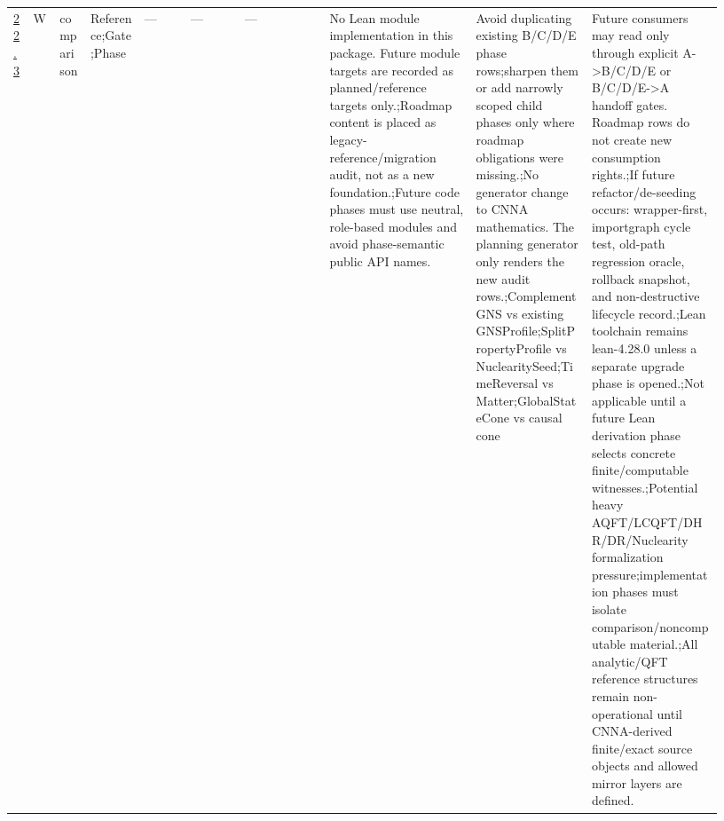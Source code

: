 \begin{longtable}{L{0.026\linewidth} L{0.024\linewidth} L{0.045\linewidth} L{0.07\linewidth} L{0.065\linewidth} L{0.075\linewidth} L{0.11\linewidth} L{0.19\linewidth} L{0.155\linewidth} L{0.17\linewidth}}
\hline
\addlinespace[0.24em]
\hyperlink{phase-row-22-3}{22.3} & W & comparison & Reference;\newline Gate;\newline Phase & --- & --- & --- & No Lean module implementation in this package. Future module targets are recorded as planned/\allowbreak{}reference targets only.;\newline Roadmap content is placed as legacy-reference/\allowbreak{}migration audit, not as a new foundation.;\newline Future code phases must use neutral, role-based modules and avoid phase-semantic public API names. & Avoid duplicating existing B/\allowbreak{}C/\allowbreak{}D/\allowbreak{}E phase rows;\newline sharpen them or add narrowly scoped child phases only where roadmap obligations were missing.;\newline No generator change to CNNA mathematics. The planning generator only renders the new audit rows.;\newline ComplementGNS vs existing GNSProfile;\newline SplitPropertyProfile vs NuclearitySeed;\newline TimeReversal vs Matter;\newline GlobalStateCone vs causal cone & Future consumers may read only through explicit A->B/\allowbreak{}C/\allowbreak{}D/\allowbreak{}E or B/\allowbreak{}C/\allowbreak{}D/\allowbreak{}E->A handoff gates. Roadmap rows do not create new consumption rights.;\newline If future refactor/\allowbreak{}de-seeding occurs: wrapper-first, importgraph cycle test, old-path regression oracle, rollback snapshot, and non-destructive lifecycle record.;\newline Lean toolchain remains lean-4.28.0 unless a separate upgrade phase is opened.;\newline Not applicable until a future Lean derivation phase selects concrete finite/\allowbreak{}computable witnesses.;\newline Potential heavy AQFT/\allowbreak{}LCQFT/\allowbreak{}DHR/\allowbreak{}DR/\allowbreak{}Nuclearity formalization pressure;\newline implementation phases must isolate comparison/\allowbreak{}noncomputable material.;\newline All analytic/\allowbreak{}QFT reference structures remain non-operational until CNNA-derived finite/\allowbreak{}exact source objects and allowed mirror layers are defined.\\

\end{longtable}
